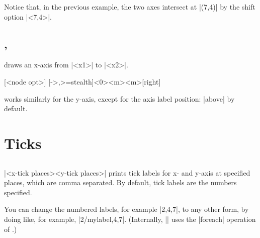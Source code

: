 Notice that, in the previous example, the two axes intersect at |(7,4)| by the shift option |<7,4>|.

\subsection{\protect\cmd{\tzaxisx}, \protect\cmd{\tzaxisy}}
\label{ssi:tzaxesx}

\icmd{\tzaxisx} draws an x-axis from |<x1>| to |<x2>|.

\begin{tzdef}
[<node opt>]
  [->,>=stealth]<0>{<m>}{<m>}{}[right]
\end{tzdef}

\icmd{\tzaxisy} works similarly for the y-axis, except for the axis label position: |above| by default.

\begin{tzcode}{.3}
\end{tzcode}


\section{Ticks}
\label{si:tikzs}

\subsection{\protect\cmd{\tzticks}}
\label{ssi:tzticks}

\icmd{\tzticks}|{<x-tick places>}{<y-tick places>}| prints tick labels for x- and y-axis at specified places, which are comma separated.
By default, tick labels are the numbers specified.

\begin{tzcode}{.3}
\end{tzcode}

You can change the numbered labels, for example |{2,4,7}|, to any other form, by doing like, for example, |{2/mylabel,4,7}|. (Internally, |\tzticks| uses the |foreach| operation of \Tikz.)


